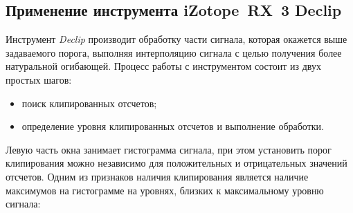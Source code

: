 \documentclass{beamer}
\begin{document}
\subsection{Применение инструмента iZotope~RX~3 Declip}
\begin{frame}
Инструмент \emph{Declip} производит обработку части сигнала, которая окажется выше задаваемого порога, выполняя интерполяцию сигнала с целью получения более натуральной огибающей. Процесс работы с инструментом состоит из двух простых шагов:

\begin{itemize}
  \item поиск клипированных отсчетов;
  \item определение уровня клипированных отсчетов и выполнение обработки.
\end{itemize}

\end{frame}

\begin{frame}
Левую часть окна занимает гистограмма сигнала, при этом установить порог клипирования можно независимо для положительных и отрицательных значений отсчетов. Одним из признаков наличия клипирования является наличие максимумов на гистограмме на уровнях, близких к максимальному уровню сигнала:

\end{frame}
\end{document}
